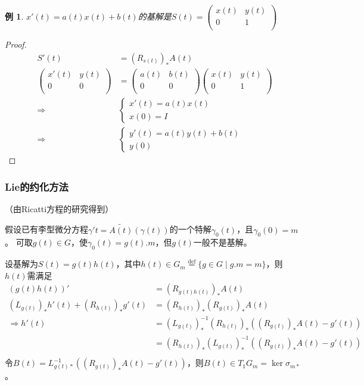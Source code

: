 \documentclass[winfonts,UTF8,c5size,a4paper,fancyhdr,hyperref,titlepage,nocap]{ctexart}
\newtheorem{exa}[thm]{例}
\theoremstyle{definition}
\theoremstyle{remark}
\numberwithin{equation}{subsection}
\newcommand{\defeq}{\stackrel{{\mathrm{def}}}{=}}
\begin{document}
\begin{exa}
  $x'(t)=a(t)x(t)+b(t)$的基解是$S(t)=\begin{pmatrix}
  x(t) & y(t) \\
  0 & 1 \\
\end{pmatrix}$
\end{exa}
\begin{proof}
\begin{align*}
  S'(t)&=(R_{s(t)})_{\ast}A(t)\\
\begin{pmatrix}
  x'(t) & y(t) \\
  0 & 0 \\
\end{pmatrix}
&=
\begin{pmatrix}
  a(t) & b(t) \\
  0 & 0 \\
\end{pmatrix}
\begin{pmatrix}
  x(t) & y(t) \\
  0 & 1 \\
\end{pmatrix}\\
\Longrightarrow&\begin{cases}
x'(t)=a(t)x(t)\\
x(0)=I
\end{cases}\\
\Longrightarrow&\begin{cases}
y'(t)=a(t)y(t)+b(t)\\
y(0)
\end{cases}
\end{align*}
\end{proof}

\subsubsection*{Lie的约化方法}（由Ricatti方程的研究得到）

假设已有李型微分方程$\gamma'{t}=\widetilde{A(t)}(\gamma(t))$的一个特解$\gamma_0(t)$，且$\gamma_0(0)=m$。
可取$g(t)\in G$，使$\gamma_0(t)=g(t).m$，但$g(t)$一般不是基解。

设基解为$S(t)=g(t)h(t)$，其中$h(t)\in G_m\defeq\{g\in G\mid g.m=m\}$，则$h(t)$需满足
\begin{align*}
(g(t)h(t))'&=(R_{g(t)h(t)})_{\ast}A(t)\\
(L_{g(t)})_{\ast}h'(t)+(R_{h(t)})_{\ast}g'(t)&=(R_{h(t)})_{\ast}(R_{g(t)})_{\ast}A(t)\\
\Longrightarrow h'(t)&=(L_{g(t)})_{\ast}^{-1}(R_{h(t)})_{\ast}((R_{g(t)})_{\ast}A(t)-g'(t))\\
                     &=(R_{h(t)})_{\ast}(L_{g(t)})_{\ast}^{-1}((R_{g(t)})_{\ast}A(t)-g'(t))\\
\end{align*}
令$B(t)=L_{g(t)\ast}^{-1}((R_{g(t)})_{\ast}A(t)-g'(t))$，则$B(t)\in T_1G_m=\ker\sigma_{m\ast}$。
\end{document}

